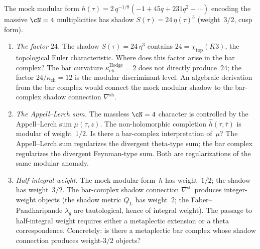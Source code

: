 \begin{openproblem}
\label{op:programme-e-mock-modularity}
The mock modular form $h(\tau) =
2\,q^{-1/8}(-1 + 45q + 231q^2 + \cdots)$ encoding the
massive $\cN = 4$ multiplicities has shadow
$S(\tau) = 24\,\eta(\tau)^3$ (weight~$3/2$, cusp form).
\begin{enumerate}[label=\textup{(\roman*)}]
\item \emph{The factor $24$.} The shadow
 $S(\tau) = 24\,\eta^3$ contains
 $24 = \chi_{\mathrm{top}}(K3)$, the topological Euler characteristic.
 Where does this factor arise in the bar complex?
 The bar curvature $\kappa_{\mathrm{ch}}^{\mathrm{Hodge}} = 2$ does not directly
 produce~$24$; the factor $24/\kappa_{\mathrm{ch}} = 12$ is the
 modular discriminant level. An algebraic derivation
 from the bar complex would connect the mock modular
 shadow to the bar-complex shadow connection
 $\nabla^{\mathrm{sh}}$.
\item \emph{The Appell--Lerch sum.} The massless $\cN = 4$
 character is controlled by the Appell--Lerch sum
 $\mu(\tau,z)$. The non-holomorphic completion
 $\hat{h}(\tau,\bar\tau)$ is modular of weight~$1/2$.
 Is there a bar-complex interpretation of~$\mu$?
 The Appell--Lerch sum regularizes the divergent
 theta-type sum; the bar complex regularizes the
 divergent Feynman-type sum.
 Both are regularizations of the same modular anomaly.
\item \emph{Half-integral weight.} The mock modular
 form~$h$ has weight~$1/2$; the shadow has weight~$3/2$.
 The bar-complex shadow connection $\nabla^{\mathrm{sh}}$
 produces integer-weight objects (the shadow metric $Q_L$
 has weight~$2$; the Faber--Pandharipande
 $\lambda_g$ are tautological, hence of integral weight).
 The passage to half-integral weight requires either
 a metaplectic extension or a theta correspondence.
 Concretely: is there a metaplectic bar complex whose
 shadow connection produces weight-$3/2$ objects?
\end{enumerate}
\end{openproblem}

